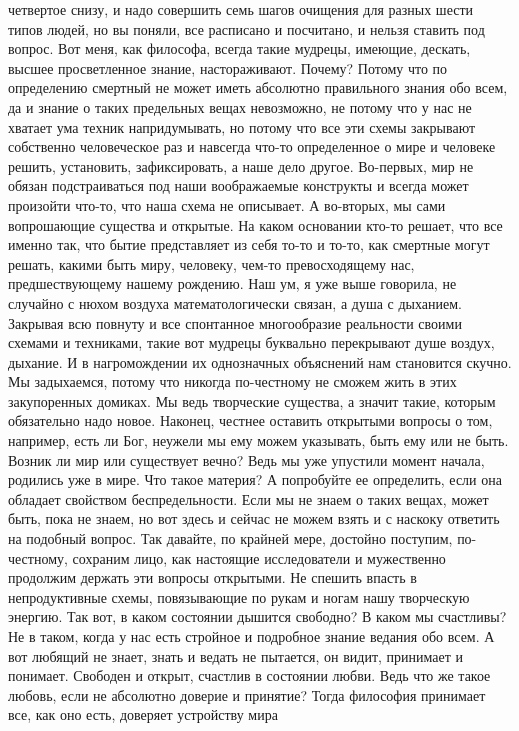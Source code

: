 четвертое снизу, и надо совершить семь шагов очищения для разных шести типов
людей, но вы поняли, все расписано и посчитано, и нельзя ставить под вопрос. Вот
меня, как философа, всегда такие мудрецы, имеющие, дескать, высшее просветленное
знание, настораживают. Почему? Потому что по определению смертный не может иметь
абсолютно правильного знания обо всем, да и знание о таких предельных вещах
невозможно, не потому что у нас не хватает ума техник напридумывать, но потому
что все эти схемы закрывают собственно человеческое раз и навсегда что-то
определенное о мире и человеке решить, установить, зафиксировать, а наше дело
другое. Во-первых, мир не обязан подстраиваться под наши воображаемые конструкты
и всегда может произойти что-то, что наша схема не описывает. А во-вторых, мы
сами вопрошающие существа и открытые. На каком основании кто-то решает, что все
именно так, что бытие представляет из себя то-то и то-то, как смертные могут
решать, какими быть миру, человеку, чем-то превосходящему нас, предшествующему
нашему рождению. Наш ум, я уже выше говорила, не случайно с нюхом воздуха
математологически связан, а душа с дыханием. Закрывая всю повнуту и все
спонтанное многообразие реальности своими схемами и техниками, такие вот мудрецы
буквально перекрывают душе воздух, дыхание. И в нагромождении их однозначных
объяснений нам становится скучно. Мы задыхаемся, потому что никогда по-честному
не сможем жить в этих закупоренных домиках. Мы ведь творческие существа, а
значит такие, которым обязательно надо новое. Наконец, честнее оставить
открытыми вопросы о том, например, есть ли Бог, неужели мы ему можем указывать,
быть ему или не быть. Возник ли мир или существует вечно? Ведь мы уже упустили
момент начала, родились уже в мире. Что такое материя? А попробуйте ее
определить, если она обладает свойством беспредельности. Если мы не знаем о
таких вещах, может быть, пока не знаем, но вот здесь и сейчас не можем взять и с
наскоку ответить на подобный вопрос. Так давайте, по крайней мере, достойно
поступим, по-честному, сохраним лицо, как настоящие исследователи и мужественно
продолжим держать эти вопросы открытыми. Не спешить впасть в непродуктивные
схемы, повязывающие по рукам и ногам нашу творческую энергию. Так вот, в каком
состоянии дышится свободно? В каком мы счастливы? Не в таком, когда у нас есть
стройное и подробное знание ведания обо всем. А вот любящий не знает, знать и
ведать не пытается, он видит, принимает и понимает. Свободен и открыт, счастлив
в состоянии любви. Ведь что же такое любовь, если не абсолютно доверие и
принятие? Тогда философия принимает все, как оно есть, доверяет устройству мира
